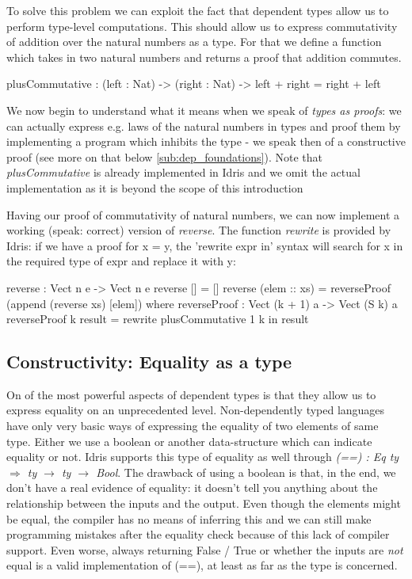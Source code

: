 To solve this problem we can exploit the fact that dependent types allow us to perform type-level computations. This should allow us to express commutativity of addition over the natural numbers as a type. For that we define a function which takes in two natural numbers and returns a proof that addition commutes. 

\begin{HaskellCode}
plusCommutative : (left : Nat) -> (right : Nat) -> left + right = right + left
\end{HaskellCode}

We now begin to understand what it means when we speak of \textit{types as proofs}: we can actually express e.g. laws of the natural numbers in types and proof them by implementing a program which inhibits the type - we speak then of a constructive proof (see more on that below \ref{sub:dep_foundations}). Note that \textit{plusCommutative} is already implemented in Idris and we omit the actual implementation as it is beyond the scope of this introduction

Having our proof of commutativity of natural numbers, we can now implement a working (speak: correct) version of \textit{reverse}. The function \textit{rewrite} is provided by Idris: if we have a proof for x = y, the 'rewrite expr in' syntax will search for x in the required type of expr and replace it with y:

\begin{HaskellCode}
reverse : Vect n e -> Vect n e
reverse [] = []
reverse (elem :: xs) = reverseProof (append (reverse xs) [elem])
  where
    reverseProof : Vect (k + 1) a -> Vect (S k) a
    reverseProof {k} result = rewrite plusCommutative 1 k in result
\end{HaskellCode}

\subsection{Constructivity: Equality as a type}
On of the most powerful aspects of dependent types is that they allow us to express equality on an unprecedented level. Non-dependently typed languages have only very basic ways of expressing the equality of two elements of same type. Either we use a boolean or another data-structure which can indicate equality or not. Idris supports this type of equality as well through \textit{(==) : Eq ty $\Rightarrow$ ty $\rightarrow$ ty $\rightarrow$ Bool}. The drawback of using a boolean is that, in the end, we don't have a real evidence of equality: it doesn't tell you anything about the relationship between the inputs and the output. Even though the elements might be equal, the compiler has no means of inferring this and we can still make programming mistakes after the equality check because of this lack of compiler support. Even worse, always returning False / True or whether the inputs are \textit{not} equal is a valid implementation of (==), at least as far as the type is concerned.

